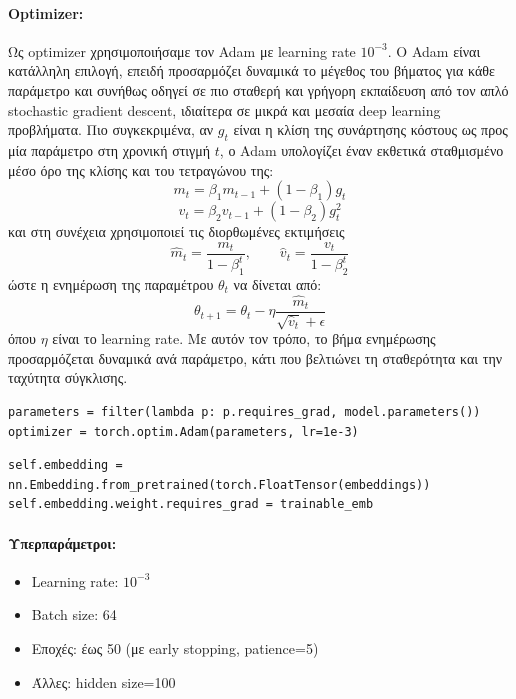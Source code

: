 \documentclass[11pt,a4paper]{article}
\begin{document}
\paragraph{\textlatin{Optimizer}:}
Ως \textlatin{optimizer} χρησιμοποιήσαμε τον \textlatin{Adam} με \textlatin{learning rate} \(10^{-3}\). Ο \textlatin{Adam} είναι κατάλληλη επιλογή, 
επειδή προσαρμόζει δυναμικά το μέγεθος του βήματος για κάθε παράμετρο και συνήθως οδηγεί σε πιο σταθερή και γρήγορη εκπαίδευση από τον απλό 
\textlatin{stochastic gradient descent}, ιδιαίτερα σε μικρά και μεσαία \textlatin{deep learning} προβλήματα. Πιο συγκεκριμένα, αν \(g_t\) είναι η 
κλίση της συνάρτησης κόστους ως προς μία παράμετρο στη χρονική στιγμή \(t\), ο \textlatin{Adam} υπολογίζει έναν εκθετικά σταθμισμένο μέσο όρο της 
κλίσης και του τετραγώνου της:
\[
m_t = \beta_1 m_{t-1} + (1-\beta_1) g_t
\]
\[
v_t = \beta_2 v_{t-1} + (1-\beta_2) g_t^2
\]
και στη συνέχεια χρησιμοποιεί τις διορθωμένες εκτιμήσεις
\[
\hat{m}_t = \frac{m_t}{1-\beta_1^t}, \qquad \hat{v}_t = \frac{v_t}{1-\beta_2^t}
\]
ώστε η ενημέρωση της παραμέτρου \(\theta_t\) να δίνεται από:
\[
\theta_{t+1} = \theta_t - \eta \frac{\hat{m}_t}{\sqrt{\hat{v}_t} + \epsilon}
\]
όπου \(\eta\) είναι το \textlatin{learning rate}. Με αυτόν τον τρόπο, το βήμα ενημέρωσης προσαρμόζεται δυναμικά ανά παράμετρο, κάτι που βελτιώνει 
τη σταθερότητα και την ταχύτητα σύγκλισης.

\begin{lstlisting}[caption={Code for optimizer definition (main.py)}]
parameters = filter(lambda p: p.requires_grad, model.parameters())
optimizer = torch.optim.Adam(parameters, lr=1e-3)
\end{lstlisting}

\begin{lstlisting}[caption={Code for freezing the embedding layer (models.py)}]
self.embedding = nn.Embedding.from_pretrained(torch.FloatTensor(embeddings))
self.embedding.weight.requires_grad = trainable_emb
\end{lstlisting}

\paragraph{Υπερπαράμετροι:}
\begin{itemize}
  \item \textlatin{Learning rate}: $10^{-3}$
  \item \textlatin{Batch size}: 64
  \item Εποχές: έως 50 (με \textlatin{early stopping}, \textlatin{patience}=5)
  \item Άλλες: \textlatin{hidden size}=100
\end{itemize}
\end{document}
